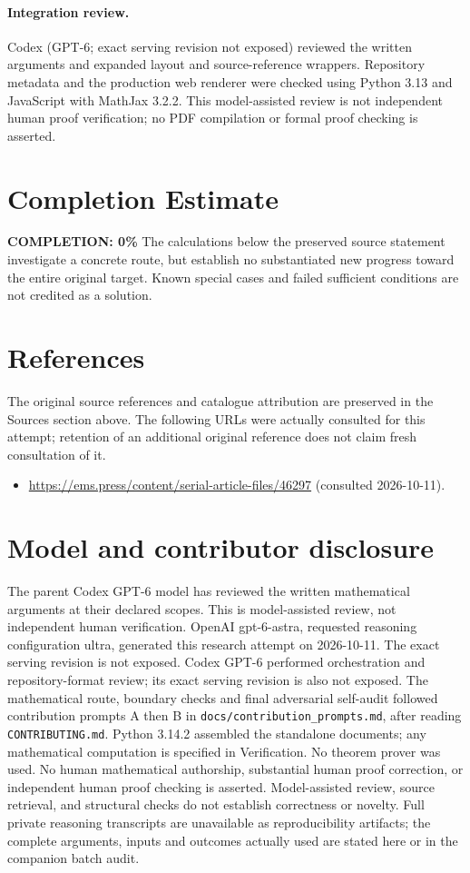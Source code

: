 \documentclass[11pt]{article}
\begin{document}
\paragraph{Integration review.} Codex (GPT-6; exact serving revision not exposed) reviewed the written arguments and expanded layout and source-reference wrappers. Repository metadata and the production web renderer were checked using Python 3.13 and JavaScript with MathJax 3.2.2. This model-assisted review is not independent human proof verification; no PDF compilation or formal proof checking is asserted.

\section{Completion Estimate}
\noindent\textbf{COMPLETION: 0\%}
The calculations below the preserved source statement investigate a concrete route,
but establish no substantiated new progress toward the entire original target.
Known special cases and failed sufficient conditions are not credited as a solution.
\section{References}
The original source references and catalogue attribution are preserved in the
Sources section above. The following URLs were actually consulted for this attempt;
retention of an additional original reference does not claim fresh consultation of it.
\begin{itemize}
\item \url{https://ems.press/content/serial-article-files/46297} (consulted 2026-10-11). 
\end{itemize}
\section{Model and contributor disclosure}
The parent Codex GPT-6 model has reviewed the written mathematical arguments at their declared scopes. This is model-assisted review, not independent human verification.
OpenAI gpt-6-astra, requested reasoning configuration ultra, generated this research
attempt on 2026-10-11. The exact serving revision is not exposed. Codex GPT-6
performed orchestration and repository-format review; its exact serving revision
is also not exposed. The mathematical route, boundary checks and final adversarial
self-audit followed contribution prompts A then B in
\texttt{docs/contribution\_prompts.md}, after reading \texttt{CONTRIBUTING.md}.
Python 3.14.2 assembled the standalone documents; any mathematical computation is
specified in Verification. No theorem prover was used. No human mathematical
authorship, substantial human proof correction, or independent human proof checking
is asserted. Model-assisted review, source retrieval, and structural checks do not
establish correctness or novelty. Full private reasoning transcripts are unavailable
as reproducibility artifacts; the complete arguments, inputs and outcomes actually
used are stated here or in the companion batch audit.
\end{document}
